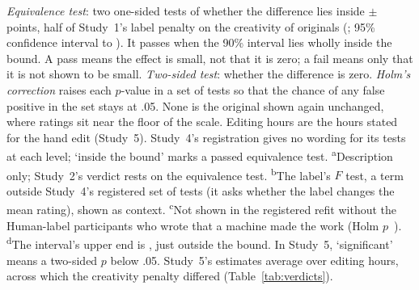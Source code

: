 \begin{table}[tbp]
{\raggedright\scriptsize \emph{Equivalence test}: two one-sided tests of whether the difference lies inside $\pm$\SourceBound{} points, half of Study~1's label penalty on the creativity of originals (\SOneHOneCreatDiffPrecise; 95\% confidence interval \SOneHOneCreatLo{} to \SOneHOneCreatHi). It passes when the 90\% interval lies wholly inside the bound. A pass means the effect is small, not that it is zero; a fail means only that it is not shown to be small. \emph{Two-sided test}: whether the difference is zero. \emph{Holm's correction} raises each $p$-value in a set of tests so that the chance of any false positive in the set stays at .05. None is the original shown again unchanged, where ratings sit near the floor of the scale. Editing hours are the hours stated for the hand edit (Study~5). Study~4's registration gives no wording for its tests at each level; `inside the bound' marks a passed equivalence test. \textsuperscript{a}Description only; Study~2's verdict rests on the equivalence test. \textsuperscript{b}The label's $F$ test, a term outside Study~4's registered set of tests (it asks whether the label changes the mean rating), shown as context. \textsuperscript{c}Not shown in the registered refit without the \SFourMachineMadeN{} Human-label participants who wrote that a machine made the work (Holm $p$~\SFourEssPenaltyPHolmRefitPrecise). \textsuperscript{d}The interval's upper end is \SFiveCreatPenaltyDramaticHiNinetyPrecise, just outside the bound. In Study~5, `significant' means a two-sided $p$ below .05. Study~5's estimates average over editing hours, across which the creativity penalty differed (Table~\ref{tab:verdicts}).\par}
\end{table}
